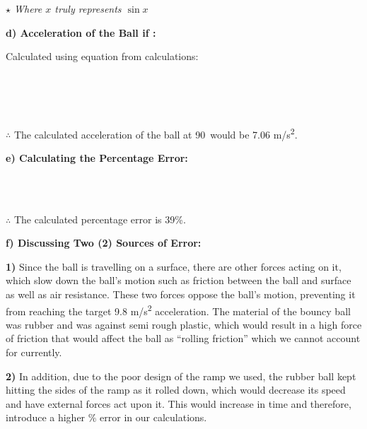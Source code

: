 \documentclass[12pt,letterpaper]{article}
\newcommand\tab[1][1cm]{\hspace*{#1}}
\begin{document}
\noindent
\tab \textit{$\star$ Where $x$ truly represents $\sin x$}

\vspace{4mm}
\noindent
\textbf{\tab d) Acceleration of the Ball if \textdegree:}

\noindent
\tab Calculated using equation from calculations:
\begin{center}
  \\
  \\
  \\
\end{center}
\vspace{-4mm}
\noindent
\tab $\therefore$ The calculated acceleration of the ball at 90\textdegree\ would be 7.06 m/s\textsuperscript{2}.

\vspace{4mm}
\noindent
\textbf{\tab e) Calculating the Percentage Error:}

\begin{center}
  \\
   \\
\end{center}
\vspace{-4mm}
\noindent
\tab $\therefore$ The calculated percentage error is 39\%.

\newpage

\noindent
\textbf{\tab f) Discussing Two (2) Sources of Error:}

\noindent
\tab \textbf{1)} Since the ball is travelling on a surface, there are other forces acting on it, which \tab slow down the ball’s motion such as friction between the ball and surface as well as \tab air resistance. These two forces oppose the ball’s motion, preventing it from reaching \tab the target 9.8 m/s\textsuperscript{2} acceleration. The material of the bouncy ball was rubber and was \tab against semi rough plastic, which would result in a high force of friction that would \tab affect the ball as “rolling friction” which we cannot account for currently.

\vspace{4mm}

\noindent
\tab \textbf{2)} In addition, due to the poor design of the ramp we used, the rubber ball kept \tab hitting the sides of the ramp as it rolled down, which would decrease its speed and \tab have external forces act upon it. This would increase in time and therefore, introduce \tab a higher \% error in our calculations.
\end{document}
